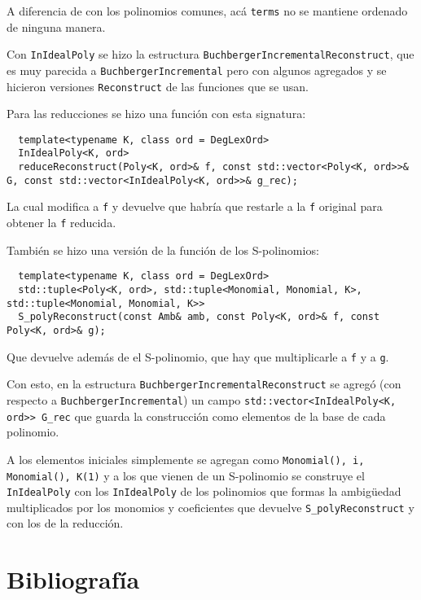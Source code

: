 \documentclass{report}
\theoremstyle{customstyle}
\theoremstyle{factstyle}
\begin{document}
A diferencia de con los polinomios comunes, acá \texttt{terms} no se mantiene ordenado de ninguna manera.

Con \texttt{InIdealPoly} se hizo la estructura \texttt{BuchbergerIncrementalReconstruct}, que es muy parecida a \texttt{BuchbergerIncremental} pero con algunos agregados y se hicieron versiones \texttt{Reconstruct} de las funciones que se usan.

Para las reducciones se hizo una función con esta signatura:

\begin{verbatim}
  template<typename K, class ord = DegLexOrd>
  InIdealPoly<K, ord>
  reduceReconstruct(Poly<K, ord>& f, const std::vector<Poly<K, ord>>& G, const std::vector<InIdealPoly<K, ord>>& g_rec);
\end{verbatim}

La cual modifica a \texttt{f} y devuelve que habría que restarle a la \texttt{f} original para obtener la \texttt{f} reducida.

También se hizo una versión de la función de los S-polinomios:

\begin{verbatim}
  template<typename K, class ord = DegLexOrd>
  std::tuple<Poly<K, ord>, std::tuple<Monomial, Monomial, K>, std::tuple<Monomial, Monomial, K>>
  S_polyReconstruct(const Amb& amb, const Poly<K, ord>& f, const Poly<K, ord>& g);
\end{verbatim}

Que devuelve además de el S-polinomio, que hay que multiplicarle a \texttt{f} y a \texttt{g}.

Con esto, en la estructura \texttt{BuchbergerIncrementalReconstruct} se agregó (con respecto a \texttt{BuchbergerIncremental}) un campo \texttt{std::vector<InIdealPoly<K, ord>> G\_rec} que guarda la construcción como elementos de la base de cada polinomio.

A los elementos iniciales simplemente se agregan como \texttt{{Monomial(), i, Monomial(), K(1)}} y a los que vienen de un S-polinomio se construye el \texttt{InIdealPoly} con los \texttt{InIdealPoly} de los polinomios que formas la ambigüedad multiplicados por los monomios y coeficientes que devuelve \texttt{S\_polyReconstruct} y con los de la reducción.


\chapter{Bibliografía}

\printbibliography[heading=none]
\end{document}
